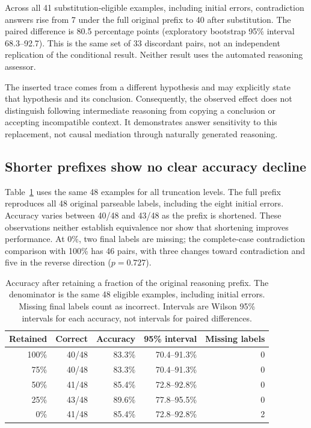 \documentclass[10pt]{article}
\begin{document}
Across all 41 substitution-eligible examples, including initial errors,
contradiction answers rise from 7 under the full original prefix to 40 after
substitution. The paired difference is 80.5 percentage points (exploratory
bootstrap 95\% interval 68.3--92.7). This is the same set of 33 discordant pairs,
not an independent replication of the conditional result. Neither result uses
the automated reasoning assessor.

The inserted trace comes from a different hypothesis and may explicitly state
that hypothesis and its conclusion. Consequently, the observed effect does not
distinguish following intermediate reasoning from copying a conclusion or
accepting incompatible context. It demonstrates answer sensitivity to this
replacement, not causal mediation through naturally generated reasoning.

\subsection{Shorter prefixes show no clear accuracy decline}
Table~\ref{tab:truncation} uses the same 48 examples for all truncation levels.
The full prefix reproduces all 48 original parseable labels, including the eight
initial errors. Accuracy varies between 40/48 and 43/48 as the prefix is
shortened. These observations neither establish equivalence nor show that
shortening improves performance. At 0\%, two final labels are missing; the
complete-case contradiction comparison with 100\% has 46 pairs, with three
changes toward contradiction and five in the reverse direction ($p=0.727$).

\begin{table}[htbp]
\centering
\caption{Accuracy after retaining a fraction of the original reasoning prefix.
The denominator is the same 48 eligible examples, including initial errors.
Missing final labels count as incorrect. Intervals are Wilson 95\% intervals
for each accuracy, not intervals for paired differences.}
\label{tab:truncation}
\begin{tabular}{rrrrr}
\toprule
Retained & Correct & Accuracy & 95\% interval & Missing labels\\
\midrule
100\% & 40/48 & 83.3\% & 70.4--91.3\% & 0\\
75\%  & 40/48 & 83.3\% & 70.4--91.3\% & 0\\
50\%  & 41/48 & 85.4\% & 72.8--92.8\% & 0\\
25\%  & 43/48 & 89.6\% & 77.8--95.5\% & 0\\
0\%   & 41/48 & 85.4\% & 72.8--92.8\% & 2\\
\bottomrule
\end{tabular}
\end{table}
\end{document}

